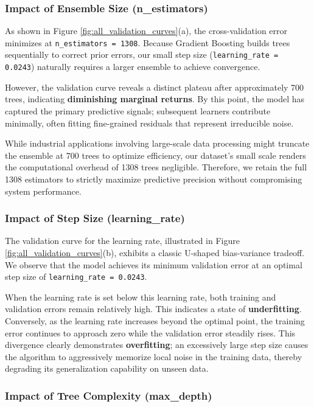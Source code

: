 \documentclass[11pt]{article}
\begin{document}
\subsubsection{Impact of Ensemble Size (n\_estimators)}

As shown in Figure \ref{fig:all_validation_curves}(a), the cross-validation error minimizes at \texttt{n\_estimators = 1308}. Because Gradient Boosting builds trees sequentially to correct prior errors, our small step size (\texttt{learning\_rate = 0.0243}) naturally requires a larger ensemble to achieve convergence.

However, the validation curve reveals a distinct plateau after approximately 700 trees, indicating \textbf{diminishing marginal returns}. By this point, the model has captured the primary predictive signals; subsequent learners contribute minimally, often fitting fine-grained residuals that represent irreducible noise.

While industrial applications involving large-scale data processing might truncate the ensemble at 700 trees to optimize efficiency, our dataset's small scale renders the computational overhead of 1308 trees negligible. Therefore, we retain the full 1308 estimators to strictly maximize predictive precision without compromising system performance.

\subsubsection{Impact of Step Size (learning\_rate)}

The validation curve for the learning rate, illustrated in Figure \ref{fig:all_validation_curves}(b), exhibits a classic U-shaped bias-variance tradeoff. We observe that the model achieves its minimum validation error at an optimal step size of \texttt{learning\_rate = 0.0243}.

When the learning rate is set below this learning rate, both training and validation errors remain relatively high. This indicates a state of \textbf{underfitting}. Conversely, as the learning rate increases beyond the optimal point, the training error continues to approach zero while the validation error steadily rises. This divergence clearly demonstrates \textbf{overfitting}; an excessively large step size causes the algorithm to aggressively memorize local noise in the training data, thereby degrading its generalization capability on unseen data.

\subsubsection{Impact of Tree Complexity (max\_depth)}
\end{document}
